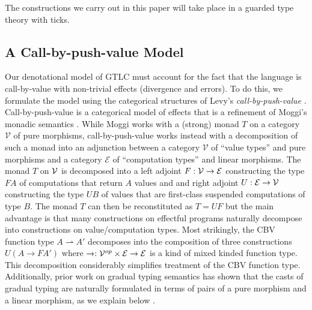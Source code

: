 The constructions we carry out in this paper will take place in a guarded type
theory with ticks.
\subsection{A Call-by-push-value Model}


Our denotational model of GTLC must account for the fact that the
language is call-by-value with non-trivial effects (divergence and
errors).  To do this, we formulate the model using the categorical
structures of Levy's \emph{call-by-push-value}
\cite{levy99}. Call-by-push-value is a categorical model of effects
that is a refinement of Moggi's monadic semantics
\cite{MOGGI199155}. While Moggi works with a (strong) monad $T$ on a
category $\mathcal V$ of pure morphisms, call-by-push-value works
instead with a decomposition of such a monad into an adjunction
between a category $\mathcal V$ of ``value types'' and pure morphisms
and a category $\mathcal E$ of ``computation types'' and linear
morphisms. The monad $T$ on $\mathcal{V}$ is decomposed into a left adjoint
$F : \mathcal{V} \to \mathcal{E}$ constructing the type $F A$ of computations that
return $A$ values and and right adjoint $U : \mathcal{E} \to \mathcal{V}$
constructing the type $U B$ of values that are first-class suspended
computations of type $B$. The monad $T$ can then be reconstituted as
$T = UF$ but the main advantage is that many constructions on
effectful programs naturally decompose into constructions on
value/computation types. Most strikingly, the CBV function type $A
\rightharpoonup A'$ decomposes into the composition of three
constructions $U(A \to F A')$ where $\to : \mathcal{V}^{op} \times \mathcal{E}
\to \mathcal{E}$ is a kind of mixed kinded function type. This decomposition
considerably simplifies treatment of the CBV function
type. Additionally, prior work on gradual typing semantics has shown
that the casts of gradual typing are naturally formulated in terms of
pairs of a pure morphism and a linear morphism, as we explain below
\cite{new-licata-ahmed2019}.

